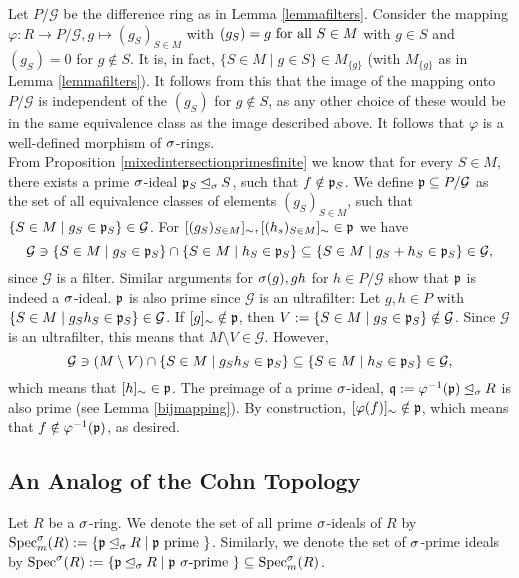 \begin{theorem}
\begin{bew}
Let $P/\mathcal{G}$ be the difference ring as in Lemma \ref{lemmafilters}. Consider the mapping $\varphi: R \rightarrow P/\mathcal{G}, g \mapsto (g_S)_{S \in M}$ with $(g_S) = g \text{ for all } S \in M$ with $g \in S$ and $(g_S) = 0$ for $g \notin S$. 
It is, in fact, $\{ S \in M \mid g \in S \} \in M_{\{g\}}$ (with $M_{\{g\}}$ as in Lemma \ref{lemmafilters}). It follows from this that the image of the mapping onto $P/\mathcal{G}$ is independent of the $(g_S)$ for $g \notin S$, as any other choice of these would be in the same equivalence class as the image described above.
It follows that $\varphi$ is a well-defined morphism of $\sigma$-rings. \\
\indent From Proposition \ref{mixedintersectionprimesfinite} we know that for every $S \in M$, there exists a prime $\sigma$-ideal $\mathfrak{p}_S \unlhd_{\sigma} S$, such that $f \notin \mathfrak{p}_S$. 
We define $\mathfrak{p} \subseteq P/\mathcal{G}$ as the set of all equivalence classes of elements $(g_S)_{S \in M}$, such that $\{ S \in M \mid g_S \in \mathfrak{p}_S \} \in \mathcal{G}$. 
For $[(g_S)_{S \in M}]_{\sim}, [(h_s)_{S \in M}]_{\sim} \in \mathfrak{p}$ we have $$ \mathcal{G} \ni \{ S \in M \mid  g_S \in \mathfrak{p}_S \} \cap  \{ S \in M \mid  h_S \in \mathfrak{p}_S \} \subseteq \{ S \in M \mid  g_S + h_S \in \mathfrak{p}_S \} \in \mathcal{G},$$
since $\mathcal{G}$ is a filter. Similar arguments for $\sigma(g), gh$ for $h \in P/\mathcal{G}$ show that $\mathfrak{p}$ is indeed a $\sigma$-ideal. $\mathfrak{p}$ is also prime since $\mathcal{G}$ is an ultrafilter:
Let $g,h \in P$ with $\{ S \in M \mid g_Sh_S \in \mathfrak{p}_S \} \in \mathcal{G}$. If $[g]_\sim \notin \mathfrak{p}$, then $V:= \{ S \in M \mid g_S \in \mathfrak{p}_S \} \notin \mathcal{G}$. Since $\mathcal{G}$ is an ultrafilter, 
this means that $M \setminus V \in \mathcal{G}$. However, $$\mathcal{G} \ni (M \setminus V) \cap \{ S \in M \mid g_S h_S \in \mathfrak{p}_S \} \subseteq \{ S \in M \mid h_S \in \mathfrak{p}_S \} \in \mathcal{G},$$
which means that $[h]_\sim \in \mathfrak{p}$. The preimage of a prime $\sigma$-ideal, $\mathfrak{q} := \varphi^{-1}(\mathfrak{p}) \unlhd_{\sigma} R$ is also prime (see Lemma \ref{bijmapping}). By construction, $[\varphi(f)]_\sim \notin \mathfrak{p}$, which means that $f \notin \varphi^{-1}(\mathfrak{p})$, as desired. 

\end{bew}
\end{theorem}

\subsection{An Analog of the Cohn Topology}

\begin{defn}
Let $R$ be a $\sigma$-ring. We denote the set of all prime $\sigma$-ideals of $R$ by $\operatorname{Spec}^\sigma_m(R):= \{ \mathfrak{p} \unlhd_{\sigma} R \mid \mathfrak{p} \text{ prime }\}$. Similarly, we denote the set of $\sigma$-prime ideals by $\operatorname{Spec}^\sigma(R):= \{ \mathfrak{p} \unlhd_{\sigma} R \mid \mathfrak{p} ~ \sigma\text{-prime }\} \subseteq \operatorname{Spec}^\sigma_m(R)$.
\index{$\sSpec$} \index{$\Spec^\s$}
\end{defn}


